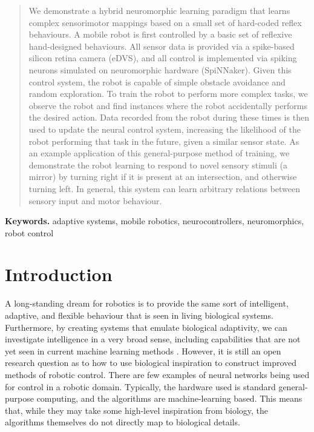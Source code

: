 \documentclass[conference]{IEEEtran}
\begin{document}
\begin{abstract}
We demonstrate a hybrid neuromorphic learning paradigm that
learns complex sensorimotor mappings based on a small
set of hard-coded reflex behaviours.  A mobile robot 
is first controlled by a basic set of reflexive hand-designed behaviours. 
All sensor data is provided via a spike-based silicon retina camera 
(eDVS), and all control is implemented via spiking neurons simulated 
on neuromorphic hardware (SpiNNaker). Given this control 
system, the robot is capable of simple obstacle avoidance and random 
exploration. To train the robot to perform more complex tasks, we 
observe the robot and find instances where the robot accidentally 
performs the desired action. Data recorded from the 
robot during these times is then used to update the neural control 
system, increasing the likelihood of the robot performing that task 
in the future, given a similar sensor state. As an example application
of this general-purpose method of training, we demonstrate the
robot learning to respond to novel sensory stimuli (a mirror) by turning
right if it is present at an intersection, and otherwise turning left.
In general, this system can learn arbitrary relations between sensory
input and motor behaviour.

\end{abstract}
\medskip
\noindent \textbf{Keywords.} adaptive systems, mobile robotics, neurocontrollers, neuromorphics, robot control


\IEEEpeerreviewmaketitle


\section{Introduction}

A long-standing dream for robotics is to provide the same sort of
intelligent, adaptive, and flexible behaviour that is seen in living
biological systems.  Furthermore, by creating systems that emulate
biological adaptivity, we can investigate intelligence in a very broad sense,
including capabilities that are not yet seen in current machine learning
methods \cite{mcfarland1993intelligent}.  However, it is still an open
research question as to how to use biological inspiration to construct
improved methods of robotic control.  There are few examples of neural networks 
being used for control \cite{janglova2005neural} in a robotic domain. 
Typically, the hardware used is standard general-purpose computing, and the 
algorithms are machine-learning based. This means that, while they may take
some high-level inspiration from biology, the algorithms themselves do not
directly map to biological details.
\end{document}
